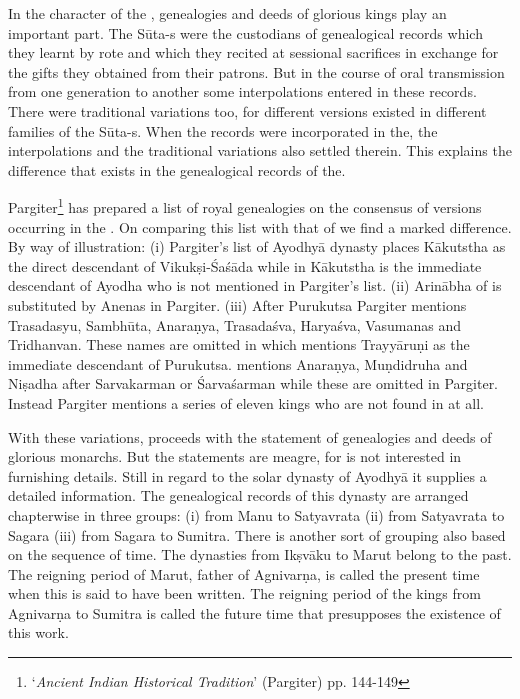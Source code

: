 In the  character of the , genealogies and deeds
of glorious kings play an important part. The Sūta-s were the custodians of
genealogical records which they learnt by rote and which they recited at
sessional sacrifices in exchange for the gifts they obtained from their patrons.
But in the course of oral transmission from one generation to another some
interpolations entered in these records. There were traditional variations too,
for different versions existed in different families of the Sūta-s. When
the records were incorporated in the, the interpolations and
the traditional variations also settled therein. This explains the difference
that exists in the genealogical records of the.

Pargiter\footnote{‘\emph{Ancient Indian Historical Tradition}’ (Pargiter) pp. 144-149}
has prepared a list of royal genealogies on the consensus of versions occurring
in the . On comparing this list with that of  we find
a marked difference. By way of illustration: (i) Pargiter’s list of Ayodhyā
dynasty places Kākutstha as the direct descendant of Vikukṣi-Śaśāda while in
 Kākutstha is the immediate descendant of Ayodha who is not
mentioned in Pargiter’s list. (ii) Arinābha of  is substituted by
Anenas in Pargiter. (iii) After Purukutsa Pargiter mentions Trasadasyu, Sambhūta,
Anaraṇya, Trasadaśva, Haryaśva, Vasumanas and Tridhanvan. These names are
omitted in  which mentions Trayyāruṇi as the immediate descendant
of Purukutsa.  mentions Anaraṇya, Muṇdidruha and Niṣadha after
Sarvakarman or Śarvaśarman while these are omitted in Pargiter. Instead Pargiter
mentions a series of eleven kings who are not found in  at all.

With these variations,  proceeds with the statement of
genealogies and deeds of glorious monarchs. But the statements are meagre,
for  is not interested in furnishing details. Still in regard to
the solar dynasty of Ayodhyā it supplies a detailed information. The genealogical
records of this dynasty are arranged chapterwise in three groups: (i) from Manu
to Satyavrata (ii) from Satyavrata to Sagara (iii) from Sagara to Sumitra. There
is another sort of grouping also based on the sequence of time. The dynasties
from Ikṣvāku to Marut belong to the past. The reigning period of Marut, father of
Agnivarṇa, is called the present time when this  is said to have been
written. The reigning period of the kings from Agnivarṇa to Sumitra is called
the future time that presupposes the existence of this work.

